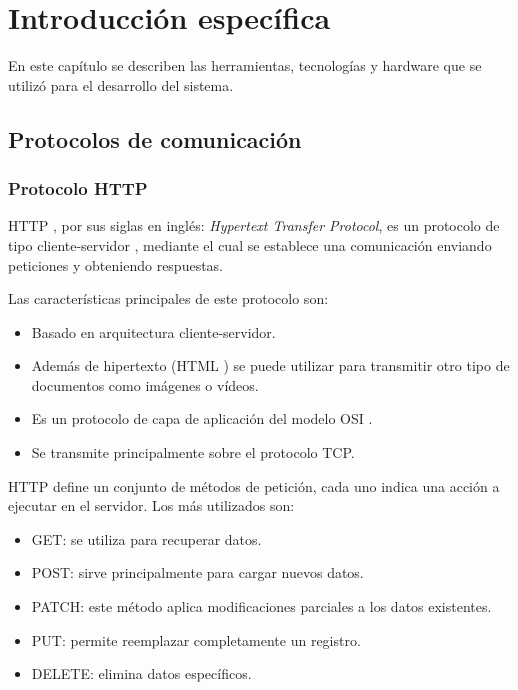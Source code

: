\chapter{Introducción específica} %

\label{Chapter2}

En este capítulo se describen las herramientas, tecnologías y hardware que se utilizó para el desarrollo del sistema.

\section{Protocolos de comunicación}
\label{sec:protocolos}

\subsection{Protocolo HTTP}

HTTP \citep{WEBSITE:HTTP}, por sus siglas en inglés: \textit{Hypertext Transfer Protocol}, es un protocolo de tipo cliente-servidor \citep{WEBSITE:CLIENTESERVIDOR}, mediante el cual se establece una comunicación enviando peticiones y obteniendo respuestas. 

Las características principales de este protocolo son:
\begin{itemize}
	\item Basado en arquitectura cliente-servidor.
	\item Además de hipertexto (HTML \citep{WEBSITE:HTML}) se puede utilizar para transmitir otro tipo de documentos como imágenes o vídeos.
	\item Es un protocolo de capa de aplicación del modelo OSI \citep{WEBSITE:OSI}.
	\item Se transmite principalmente sobre el protocolo TCP\citep{WEBSITE:TCP}.	
\end{itemize}

HTTP define un conjunto de métodos de petición, cada uno indica una acción a ejecutar en el servidor. Los más utilizados son:
\begin{itemize}
	\item GET: se utiliza para recuperar datos.
	\item POST: sirve principalmente para cargar nuevos datos.
	\item PATCH: este método aplica modificaciones parciales a los datos existentes.
	\item PUT: permite reemplazar completamente un registro.
	\item DELETE: elimina datos específicos.	
\end{itemize}



